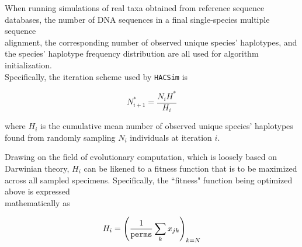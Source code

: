 When running simulations of real taxa obtained from reference sequence databases, the number of DNA sequences in a final single-species multiple sequence \\ alignment, the corresponding number of observed unique species' haplotypes, and the species' haplotype frequency distribution are all used for algorithm initialization. \\ Specifically, the iteration scheme used by {\tt HACSim} is

\begin{equation}
N^*_{i+1} = \frac{N_iH^*}{H_i}
\end{equation}

\noindent where $H_i$ is the cumulative mean number of observed unique species' haplotypes found from randomly sampling $N_i$ individuals at iteration $i$.

 

Drawing on the field of evolutionary computation, which is loosely based on Darwinian theory, $H_i$ can be likened to a fitness function that is to be maximized across all sampled specimens. Specifically, the ``fitness" function being optimized above is expressed \\ mathematically as

\begin{equation}
H_i = \left(\dfrac{1}{{\tt perms}}\sum_{k}{x_{jk}}\right)_{k=N}
\end{equation}

